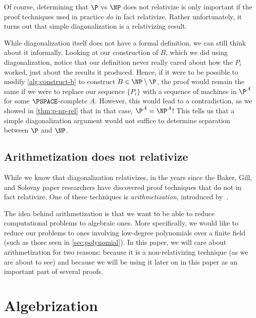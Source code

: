 \documentclass[english,12pt]{reedthesis}
\theoremstyle{plain}
\theoremstyle{definition}
\theoremstyle{remark}
\begin{document}
Of course, determining that $\P$ vs $\NP$ does not relativize is only important
if the proof techniques used in practice \emph{do} in fact relativize. Rather
unfortunately, it turns out that simple diagonalization is a relativizing
result.

While diagonalization itself does not have a formal definition, we can still
think about it informally. Looking at our construction of $B$, which we did
using diagonalization, notice that our definition never really cared about how
the $P_{i}$ worked, just about the results it produced. Hence, if it were to be
possible to modify \cref{alg:construct-b} to construct $B \in \NP \setminus \P$, the proof
would remain the same if we were to replace our sequence $\{P_{i}\}$ with a
sequence of machines in $\P^{A}$ for some $\PSPACE$-complete $A$. However, this
would lead to a contradiction, as we showed in \cref{thm:p-np-rel} that in that
case, $\P^{A} = \NP^{A}$! This tells us that a simple diagonalization argument
would not suffice to determine separation between $\P$ and $\NP$.

\section{Arithmetization does not relativize}\label{sec:arith-non-rel}

While we know that diagonalization relativizes, in the years since the Baker,
Gill, and Solovay paper researchers have discovered proof techniques that do not
in fact relativize. One of these techniques is
\emph{arithmetization}, introduced by~\cite{BF91}.

The idea behind arithmetization is that we want to be able to reduce
computational problems to algebraic ones. More specifically, we would like to
reduce our problems to ones involving low-degree polynomials over a finite field
(such as those seen in \cref{sec:polynomial}). In this paper, we will care about
arithmetization for two reasons: because it is a non-relativizing technique (as
we are about to see) and because we will be using it later on in this paper as
an important part of several proofs. %


\chapter{Algebrization}\label{chap:algebrization}
\end{document}
